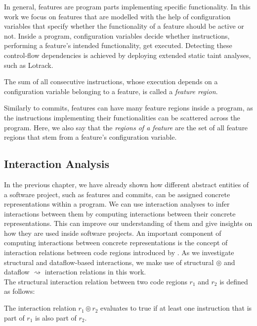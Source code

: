In general, features are program parts implementing specific functionality.
In this work we focus on features that are modelled with the help of configuration variables that specify whether the functionality of a feature should be active or not.
Inside a program, configuration variables decide whether instructions, performing a feature's intended functionality, get executed. 
Detecting these control-flow dependencies is achieved by deploying extended static taint analyses, such as Lotrack.

\begin{definition}\label{def:feature_regions}
	The sum of all consecutive instructions, whose execution depends on a configuration variable belonging to a feature, is called a \emph{feature region}. 
\end{definition}

Similarly to commits, features can have many feature regions inside a program,
as the instructions implementing their functionalities can be scattered across the program.
Here, we also say that the \emph{regions of a feature} are the set of all feature regions that stem from a feature's configuration variable. 

\subsection*{Interaction Analysis}\label{sec:interaction_analysis}

In the previous chapter, we have already shown how different abstract entities of a software project, such as features and commits, can be assigned concrete representations within a program.
We can use interaction analyses to infer interactions between them by computing interactions between their concrete representations.
This can improve our understanding of them and give insights on how they are used inside software projects. 
An important component of computing interactions between concrete representations is the concept of interaction relations between code regions introduced by \citet{sattler2023thesis}.
As we investigate structural and dataflow-based interactions, we make use of structural $\circledcirc$ and dataflow $\rightsquigarrow$ interaction relations in this work. \\
The structural interaction relation between two code regions $r_1$ and $r_2$ is defined as follows:

\begin{definition}\label{def:structural_relation}
	The interaction relation $r_1 \circledcirc r_2$ evaluates to true if at least one instruction that is part of $r_1$
	is also part of $r_2$.
\end{definition}

